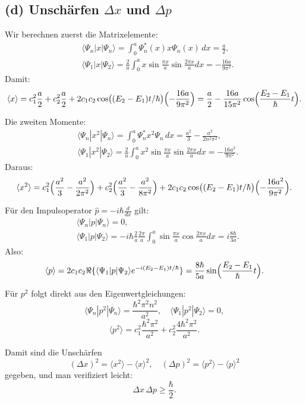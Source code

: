 \documentclass[a4paper,11pt]{article}
\begin{document}
\subsection*{(d) Unschärfen $\Delta x$ und $\Delta p$}
Wir berechnen zuerst die Matrixelemente:
\begin{align*}
&\langle\Psi_n|x|\Psi_n\rangle=\int_0^a\Psi_n^*(x)x\Psi_n(x)\,dx=\frac{a}{2}, \\
&\langle\Psi_1|x|\Psi_2\rangle=\frac{2}{a}\int_0^ax\sin\frac{\pi x}{a}\sin\frac{2\pi x}{a}dx
= -\frac{16a}{9\pi^2}.
\end{align*}
Damit:
\[
\langle x\rangle=c_1^2\frac{a}{2}+c_2^2\frac{a}{2}+2c_1c_2\cos\bigl((E_2-E_1)t/\hbar\bigr)\Bigl(-\frac{16a}{9\pi^2}\Bigr)
=\frac{a}{2}-\frac{16a}{15\pi^2}\cos\Bigl(\frac{E_2-E_1}{\hbar}t\Bigr).
\]

Die zweiten Momente:
\begin{align*}
&\langle\Psi_n|x^2|\Psi_n\rangle=\int_0^a\Psi_n^* x^2\Psi_n\,dx=\frac{a^2}{3}-\frac{a^2}{2n^2\pi^2}, \\
&\langle\Psi_1|x^2|\Psi_2\rangle=\frac{2}{a}\int_0^ax^2\sin\frac{\pi x}{a}\sin\frac{2\pi x}{a}dx
= -\frac{16a^2}{9\pi^2}.
\end{align*}
Daraus:
\[
\langle x^2\rangle=c_1^2\Bigl(\frac{a^2}{3}-\frac{a^2}{2\pi^2}\Bigr)
+c_2^2\Bigl(\frac{a^2}{3}-\frac{a^2}{8\pi^2}\Bigr)
+2c_1c_2\cos\bigl((E_2-E_1)t/\hbar\bigr)\Bigl(-\frac{16a^2}{9\pi^2}\Bigr).
\]

Für den Impulsoperator $\hat p=-i\hbar\frac{d}{dx}$ gilt:
\begin{align*}
&\langle\Psi_n|p|\Psi_n\rangle=0, \\
&\langle\Psi_1|p|\Psi_2\rangle=-i\hbar\frac{2}{a}\frac{2\pi}{a}\int_0^a\sin\frac{\pi x}{a}\cos\frac{2\pi x}{a}dx
=i\frac{8\hbar}{3a}.
\end{align*}
Also:
\[
\langle p\rangle=2c_1c_2\Re\{\langle\Psi_1|p|\Psi_2\rangle e^{-i(E_2-E_1)t/\hbar}\}
=\frac{8\hbar}{5a}\sin\Bigl(\frac{E_2-E_1}{\hbar}t\Bigr).
\]

Für $p^2$ folgt direkt aus den Eigenwertgleichungen:
\[
\langle\Psi_n|p^2|\Psi_n\rangle=\frac{\hbar^2\pi^2n^2}{a^2},
\quad
\langle\Psi_1|p^2|\Psi_2\rangle=0,
\]
\[
\langle p^2\rangle=c_1^2\frac{\hbar^2\pi^2}{a^2}+c_2^2\frac{4\hbar^2\pi^2}{a^2}.
\]

Damit sind die Unschärfen
\[
(\Delta x)^2=\langle x^2\rangle-\langle x\rangle^2,
\quad
(\Delta p)^2=\langle p^2\rangle-\langle p\rangle^2
\]
gegeben, und man verifiziert leicht:
\[
\Delta x\,\Delta p\ge\frac{\hbar}{2}.
\]
\end{document}

